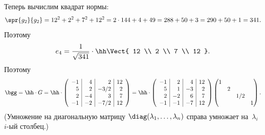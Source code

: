 \begin{solution}
	Теперь вычислим квадрат нормы:
	\[
		\spr{g_2}{g_2} =
		12^2 + 2^2 + 7^2 + 12^2 =
		2 \cdot 144 + 4 + 49 =
		288 + 50 + 3 =
		290 + 50 + 1 =
		341
		.
	\]
	Поэтому
	\[
		e_4 =
		\frac{1}{\sqrt{341}}
		\cdot
		\hh
		\Vect{
			12 \\ 2 \\ 7 \\ 12
		}
		.
	\]
	Поэтому
	\[
		\bgg = \hh \cdot G =
		\hh \cdot
		\left( 
			\begin{array}{r|r|r|r}
				-1 &  4 &  2   & 12 \\
				 5 &  2 & -3/2 &  2 \\
				 2 & -4 &  3   &  7 \\
				-1 & -2 & -7/2 & 12
			\end{array}
		\right)
		=
		\hh \cdot
		\left( 
			\begin{array}{r|r|r|r}
				-1 &  2 &  4 & 12 \\
				 5 &  1 & -3 &  2 \\
				 2 & -2 &  6 &  7 \\
				-1 & -1 & -7 & 12
			\end{array}
		\right)
		\begin{pmatrix}
			1 \\
			& 2 \\
			&& 1/2 \\
			&&& 1
		\end{pmatrix}
		.
	\]
	(Умножение на диагональную матрицу $\diag(\lambda_1, \dots, \lambda_n)$ справа умножает на~$\lambda_i$ $i$-ый столбец.)


\end{solution}
